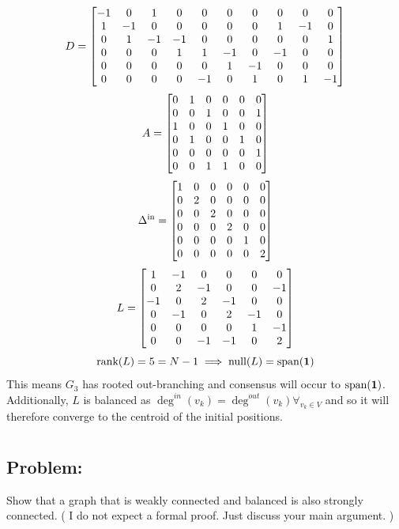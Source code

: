 \documentclass[]{article}
\numberwithin{equation}{section}
\begin{document}
\[
    D = \mqty[
        -1 & 0  & 1  & 0  & 0  & 0  & 0  & 0  & 0  & 0  \\
        1  & -1 & 0  & 0  & 0  & 0  & 0  & 1  & -1 & 0  \\
        0  & 1  & -1 & -1 & 0  & 0  & 0  & 0  & 0  & 1  \\
        0  & 0  & 0  & 1  & 1  & -1 & 0  & -1 & 0  & 0  \\
        0  & 0  & 0  & 0  & 0  & 1  & -1 & 0  & 0  & 0  \\
        0  & 0  & 0  & 0  & -1 & 0  & 1  & 0  & 1  & -1
    ]
\]\[
    A = \mqty[
        0 & 1 & 0 & 0 & 0 & 0 \\
        0 & 0 & 1 & 0 & 0 & 1 \\
        1 & 0 & 0 & 1 & 0 & 0 \\
        0 & 1 & 0 & 0 & 1 & 0 \\
        0 & 0 & 0 & 0 & 0 & 1 \\
        0 & 0 & 1 & 1 & 0 & 0
    ]
\]\[
    \Delta^{\text{in}} = \mqty[
        1 & 0 & 0 & 0 & 0 & 0 \\
        0 & 2 & 0 & 0 & 0 & 0 \\
        0 & 0 & 2 & 0 & 0 & 0 \\
        0 & 0 & 0 & 2 & 0 & 0 \\
        0 & 0 & 0 & 0 & 1 & 0 \\
        0 & 0 & 0 & 0 & 0 & 2
    ]
\]\[
    L = \mqty[
        1  & -1 & 0  & 0  & 0  & 0  \\
        0  & 2  & -1 & 0  & 0  & -1 \\
        -1 & 0  & 2  & -1 & 0  & 0  \\
        0  & -1 & 0  & 2  & -1 & 0  \\
        0  & 0  & 0  & 0  & 1  & -1 \\
        0  & 0  & -1 & -1 & 0  & 2
    ]
\] \[
    \text{rank}(L) = 5 = N-1 \implies \text{null}(L) = \text{span}(\vb{1})
\] This means $G_3$ has rooted out-branching and consensus will occur to $\text{span}(\vb{1})$.
Additionally, $L$ is balanced as $\deg^{in}(v_k) = \deg^{out}(v_k) \forall_{v_k \in V}$
{\color{red} and so it will therefore converge to the centroid of the initial positions.}




\newpage
\section{}
\subsection*{Problem:}
Show that a graph that is weakly connected and balanced is also strongly connected.
(
    I do not expect a formal proof.
    Just discuss your main argument.
)
\end{document}
